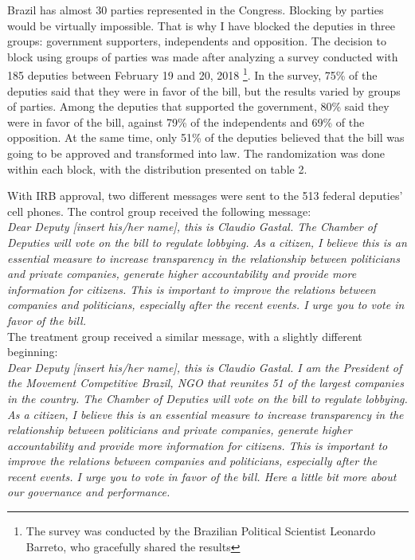 \documentclass[12pt,a4paper]{article}
\begin{document}
Brazil has almost 30 parties represented in the Congress. Blocking by parties would be virtually impossible. That is why I have blocked the deputies in three groups: government supporters, independents and opposition. The decision to block using groups of parties was made after analyzing a survey conducted with 185 deputies between February 19 and 20, 2018 \footnote{The survey was conducted by the Brazilian Political Scientist Leonardo Barreto, who gracefully shared the results}. In the survey, 75\% of the deputies said that they were in favor of the bill, but the results varied by groups of parties. Among the deputies that supported the government, 80\% said they were in favor of the bill, against 79\% of the independents and 69\% of the opposition.  At the same time, only 51\% of the deputies believed that the bill was going to be approved and transformed into law. The randomization was done within each block, with the distribution presented on table 2.

With IRB approval, two different messages were sent to the 513 federal deputies' cell phones. The control group received the following message:\\
 

\textit{Dear Deputy [insert his/her name], this is Claudio Gastal. The Chamber of Deputies will vote on the bill to regulate lobbying. As a citizen, I believe this is an essential measure to increase transparency in the relationship between politicians and private companies, generate higher accountability and provide more information for citizens. This is important to improve the relations between companies and politicians, especially after the recent events. I urge you to vote in favor of the bill. 
}\\

The treatment group received a similar message, with a slightly different beginning:\\
 

\textit{Dear Deputy [insert his/her name], this is Claudio Gastal. I am the President of the Movement Competitive Brazil, NGO that reunites 51 of the largest companies in the country. The Chamber of Deputies will vote on the bill to regulate lobbying. As a citizen, I believe this is an essential measure to increase transparency in the relationship between politicians and private companies, generate higher accountability and provide more information for citizens. This is important to improve the relations between companies and politicians, especially after the recent events. I urge you to vote in favor of the bill. Here a little bit more about our governance and performance.} \\
\end{document}
